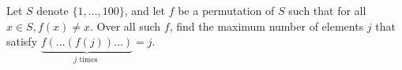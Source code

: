 Let $S$ denote $\{1, \ldots, 100\}$, and let $f$ be a permutation of $S$ such that for all $x \in S, f(x) \neq x$. Over all such $f$, find the maximum number of elements $j$ that satisfy $\underbrace{f(\ldots(f(j)) \ldots)}_{j \text { times }}=j$.